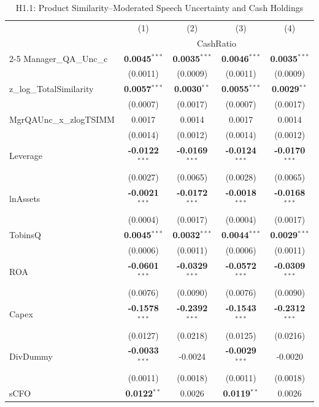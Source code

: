 \documentclass[11pt,a4paper]{article}
\begin{document}
\begin{table}[htbp]
\centering
\caption{H1.1: Product Similarity--Moderated Speech Uncertainty and Cash Holdings}
\label{tab:h1_1}
\scriptsize
\begin{tabular}{lcccc}
\toprule
 & (1) & (2) & (3) & (4) \\
 & \multicolumn{4}{c}{CashRatio} \\
\cmidrule(lr){2-5}
\midrule
Manager\_QA\_Unc\_c & \textbf{0.0045}$^{***}$ & \textbf{0.0035}$^{***}$ & \textbf{0.0046}$^{***}$ & \textbf{0.0035}$^{***}$ \\
 & (0.0011) & (0.0009) & (0.0011) & (0.0009) \\
z\_log\_TotalSimilarity & \textbf{0.0057}$^{***}$ & \textbf{0.0030}$^{**}$ & \textbf{0.0055}$^{***}$ & \textbf{0.0029}$^{**}$ \\
 & (0.0007) & (0.0017) & (0.0007) & (0.0017) \\
MgrQAUnc\_x\_zlogTSIMM & 0.0017 & 0.0014 & 0.0017 & 0.0014 \\
 & (0.0014) & (0.0012) & (0.0014) & (0.0012) \\
\midrule
Leverage & \textbf{-0.0122}$^{***}$ & \textbf{-0.0169}$^{***}$ & \textbf{-0.0124}$^{***}$ & \textbf{-0.0170}$^{***}$ \\
 & (0.0027) & (0.0065) & (0.0028) & (0.0065) \\
lnAssets & \textbf{-0.0021}$^{***}$ & \textbf{-0.0172}$^{***}$ & \textbf{-0.0018}$^{***}$ & \textbf{-0.0168}$^{***}$ \\
 & (0.0004) & (0.0017) & (0.0004) & (0.0017) \\
TobinsQ & \textbf{0.0045}$^{***}$ & \textbf{0.0032}$^{***}$ & \textbf{0.0044}$^{***}$ & \textbf{0.0029}$^{***}$ \\
 & (0.0006) & (0.0011) & (0.0006) & (0.0011) \\
ROA & \textbf{-0.0601}$^{***}$ & \textbf{-0.0329}$^{***}$ & \textbf{-0.0572}$^{***}$ & \textbf{-0.0309}$^{***}$ \\
 & (0.0076) & (0.0090) & (0.0076) & (0.0090) \\
Capex & \textbf{-0.1578}$^{***}$ & \textbf{-0.2392}$^{***}$ & \textbf{-0.1543}$^{***}$ & \textbf{-0.2312}$^{***}$ \\
 & (0.0127) & (0.0218) & (0.0125) & (0.0216) \\
DivDummy & \textbf{-0.0033}$^{***}$ & -0.0024 & \textbf{-0.0029}$^{***}$ & -0.0020 \\
 & (0.0011) & (0.0018) & (0.0011) & (0.0018) \\
sCFO & \textbf{0.0122}$^{**}$ & 0.0026 & \textbf{0.0119}$^{**}$ & 0.0026 \\

\end{tabular}
\end{table}
\end{document}
